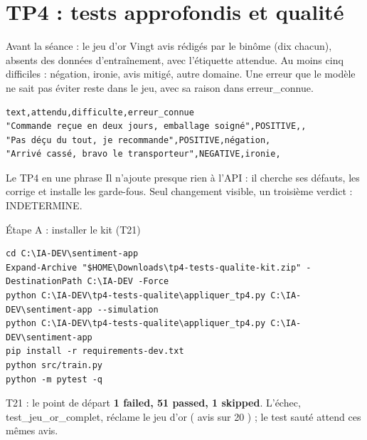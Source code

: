 \documentclass[aspectratio=169,11pt]{beamer}
\newcommand{\co}[1]{{\ttfamily\hyphenchar\font=45\relax #1}}
\begin{document}
\section{TP4 : tests approfondis et qualité}

\begin{frame}[fragile]{Avant la séance : le jeu d'or}
\small Vingt avis rédigés par le binôme (dix chacun), absents des données d'entraînement, avec l'étiquette
attendue. Au moins cinq difficiles : négation, ironie, avis mitigé, autre domaine. Une erreur que le modèle
ne sait pas éviter reste dans le jeu, avec sa raison dans \co{erreur\_connue}.
\begin{lstlisting}
text,attendu,difficulte,erreur_connue
"Commande reçue en deux jours, emballage soigné",POSITIVE,,
"Pas déçu du tout, je recommande",POSITIVE,négation,
"Arrivé cassé, bravo le transporteur",NEGATIVE,ironie,
\end{lstlisting}
\begin{block}{Le TP4 en une phrase}
Il n'ajoute presque rien à l'API : il cherche ses défauts, les corrige et installe les garde-fous. Seul
changement visible, un troisième verdict : \co{INDETERMINE}.
\end{block}
\end{frame}

\begin{frame}[fragile]{Étape A : installer le kit (T21)}
\begin{lstlisting}
cd C:\IA-DEV\sentiment-app
Expand-Archive "$HOME\Downloads\tp4-tests-qualite-kit.zip" -DestinationPath C:\IA-DEV -Force
python C:\IA-DEV\tp4-tests-qualite\appliquer_tp4.py C:\IA-DEV\sentiment-app --simulation
python C:\IA-DEV\tp4-tests-qualite\appliquer_tp4.py C:\IA-DEV\sentiment-app
pip install -r requirements-dev.txt
python src/train.py
python -m pytest -q
\end{lstlisting}
\begin{exampleblock}{T21 : le point de départ}
\textbf{1 failed, 51 passed, 1 skipped}. L'échec, \co{test\_jeu\_or\_complet}, réclame le jeu d'or ( avis
sur 20 \fg{}) ; le test sauté attend ces mêmes avis.
\end{exampleblock}
\end{frame}
\end{document}

